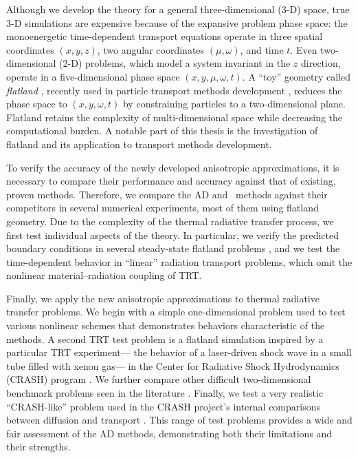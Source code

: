 Although we develop the theory for a general three-dimensional (3-D) space,
true \mbox{3-D} simulations are expensive because of the expansive problem phase
space: the monoenergetic time-dependent transport equations operate in three
spatial coordinates $(x,y,z)$,
two angular coordinates $(\mu,\omega)$, and time $t$.
Even two-dimensional (2-D)
problems, which model a system invariant in the $z$ direction, operate in  a
five-dimensional phase space $(x,y,\mu,\omega,t)$. A ``toy'' geometry called
\emph{flatland}
\cite{Abb1884}, recently used in particle transport methods development
\cite{Asa2008,Lar2009c},
reduces the phase space to $(x,y,\omega,t)$ by constraining particles to a
two-dimensional plane. Flatland retains the complexity of multi-dimensional
space while decreasing the computational burden. A notable part of this thesis
is the investigation of flatland and its application to transport methods
development.

To verify the accuracy of the newly developed anisotropic approximations, it is
necessary to
compare their performance and accuracy against that of existing, proven methods.
Therefore, we compare the AD and \APone\ methods against their competitors in several numerical
experiments, most of them using flatland geometry. Due to the complexity of
the thermal radiative transfer process, we first test individual aspects of the
theory. In particular, we verify the predicted boundary conditions in several
steady-state flatland problems \cite{Joh2011a}, and we test the time-dependent
behavior in ``linear'' radiation transport problems, which omit the nonlinear
material--radiation coupling of TRT.

Finally, we apply the new anisotropic approximations to thermal radiative
transfer problems. We begin with a simple one-dimensional problem used to test
various nonlinear schemes \cite{Rau2005} that demonstrates behaviors
characteristic of the methods. A second TRT test problem is a flatland simulation
\cite{Joh2011} inspired by a particular TRT experiment---%
the behavior of a laser-driven shock wave in a small tube filled with xenon
gas---%
in the Center for Radiative Shock Hydrodynamics (CRASH) program
\cite{Crash2010}. We further compare other difficult two-dimensional
benchmark problems seen in the literature \cite{Mou2006}.
Finally, we test a very realistic ``CRASH-like'' problem used in the
CRASH project's internal comparisons between diffusion and
transport \cite{Ada2010}. This range of test problems provides a wide and
fair assessment of the AD methods, demonstrating both their limitations and
their strengths.

